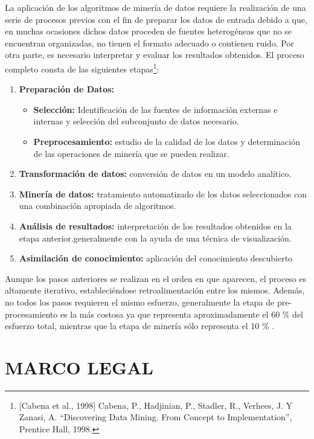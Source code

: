 \documentclass[a4paper,openright,12pt]{book}
\theoremstyle{definition}
\theoremstyle{remark}
\begin{document}
La aplicación de los algoritmos de minería de datos requiere la realización de una serie de procesos previos con el fin de  preparar los datos de entrada debido a que, en muchas ocasiones dichos datos proceden de fuentes heterogéneas que no se encuentran organizadas, no tienen el formato adecuado o
contienen ruido. Por otra parte, es necesario interpretar y evaluar los resultados obtenidos. El proceso completo consta de las siguientes etapas\footnote{[Cabena et al., 1998] Cabena, P., Hadjinian, P., Stadler, R., Verhees, J. Y Zanasi, A.
“Discovering Data Mining. From Concept to Implementation”, Prentice Hall, 1998.}:

\begin{enumerate}
\item \textbf{Preparación de Datos:}
	\begin{itemize}
		\item \textbf{Selección:} Identificación de las fuentes de información externas e internas y selección del subconjunto de datos necesario.
        \item \textbf{Preprocesamiento:} estudio de la calidad de los datos y determinación de las operaciones de minería que se pueden realizar.
\end{itemize}
\item \textbf{Transformación de datos:} conversión de datos en un modelo analítico.
\item \textbf{Minería de datos:} tratamiento automatizado de los datos seleccionados con una combinación apropiada de algoritmos.
\item \textbf{Análisis de resultados:} interpretación de los resultados obtenidos en la etapa anterior.generalmente con la ayuda de una técnica de visualización.
\item \textbf{Asimilación de conocimiento:} aplicación del conocimiento descubierto
\end{enumerate}

Aunque los pasos anteriores se realizan en el orden en que aparecen, el proceso es altamente iterativo, estableciéndose retroalimentación entre los mismos. Además, no todos los pasos requieren el mismo esfuerzo, generalmente la etapa de pre-procesamiento es la más costosa ya que representa aproximadamente el 60 \% del esfuerzo total, mientras que la etapa de minería sólo representa el 10 \% . 

\section{MARCO LEGAL}
\end{document}
